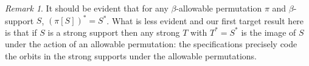 \documentclass{article}
\theoremstyle{definition}
\newtheorem{proposition}[theorem]{Proposition}
\theoremstyle{remark}
\newtheorem{remark}[theorem]{Remark}
\begin{document}
\begin{comment}
\begin{proposition}[equality of specifications]\label{prop:spec_eq_iff}
Let $S, T$ be $\beta$-supports.
Then $S^* = T^*$ if and only if the following conditions hold.

\begin{enumerate}

\item $S$ and $T$ have the same domain, and $\pi_2(S_\epsilon) = \pi_2(T_\epsilon)$ whenever either is defined.
\item $\pi_1(S_\epsilon)$ is a singleton if and only if $\pi_1(T_\epsilon)$ is a singleton.
\item If $S_\epsilon = (\{x\},A)$ and $T_\epsilon = (\{y\},A)$, then the indices $\zeta$ for which $S_\epsilon = (t,A)$ with $x \in t$ are the same as the indices for which $T_\zeta = (t',A)$ with $y \in t'$.
\item If $S_\epsilon = (M,A)$ and $T_\epsilon = (N,A)$ where $M$ is $A$-flexible, then so is $N$, and the indices $\zeta$ for which $S_\zeta = (P,A)$ with $M \sim P$ are the same as the indices for which $T_\zeta = (Q,A)$ with $N \sim Q$.
\item If $S_\epsilon = (M,A)$ and $T_\epsilon = (N,A)$ where $M \sim f_{\gamma,\beta}(x,T)$ for $\beta = {\tt min}(A_1)$ and $-1 \leq \gamma < {\tt min}(A_2)$, then there is a $\gamma$-allowable permutation $\pi$ such that $N \sim f_{\gamma,\beta}(\pi(x),\pi[T])$, and moreover, for any $(t,B)$ in the range of $T$, we have $S_\zeta = (t, A_2 \cup B)$ if and only if $T_\zeta = (\pi_B``t, A_2 \cup B)$.

\end{enumerate}
\end{proposition}
\begin{proof}
Direct, making use of the fact that $\chi_{x,T} = \chi_{y,U}$ if and only if there is some allowable permutation such that $\pi(x) = y$ and $\pi[T] = U$.
\end{proof}
\end{comment}

\begin{remark}
It should be evident that for any $\beta$-allowable permutation $\pi$ and $\beta$-support $S$, $(\pi[S])^* = S^*$.  What is less evident and our first target result here is that if $S$ is a strong support then any strong $T$ with $T^* = S^*$ is the image of $S$ under the action of an allowable permutation:  the specifications precisely code the orbits in the strong supports under the allowable permutations.
\end{remark}
\end{document}
